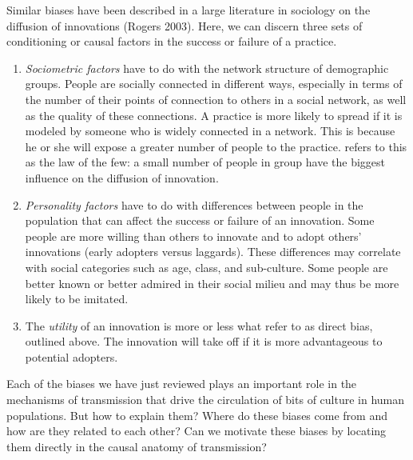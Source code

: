 Similar biases have been described in a large literature in sociology on 
the diffusion of innovations (Rogers 2003). Here, we can discern three 
sets of conditioning or causal factors in the success or failure of a 
practice. 

\begin{enumerate}
\item \textit{Sociometric factors} have to do with the network structure of 
demographic groups. People are socially 
connected in different ways, especially in terms of the number of their points of 
connection to others in a social network, as well as the quality of these connections. A practice is more likely to spread if 
it is modeled by someone who is widely connected in a network. This is because he or she will expose a greater number of people to the 
practice. \citet{gladwell_tipping_2000} refers to this as the law of the few: a small number of people in group have the biggest influence on the diffusion of innovation. 



\item \textit{Personality factors} have to do with differences between 
people in the population that can affect the success 
or failure of an innovation. Some people are more willing than others to 
innovate and to adopt others' innovations (early adopters versus 
laggards). These differences may correlate with social categories 
such as age, class, and sub-culture. Some people are better known or 
better admired in their social milieu and may thus be more likely to be 
imitated. 



\item The \textit{utility} of an innovation is more or 
less what \citet{boyd_culture_1985} refer to as direct bias,  outlined 
above. The innovation will take off if it is more advantageous to 
potential adopters. 
\end{enumerate}



Each of the biases we have just reviewed plays an important 
role in the mechanisms of transmission that drive the circulation of 
bits of culture in human populations. But how to explain them? Where do 
these biases come from and how are they related to each other? Can we motivate these biases by 
locating them directly in the causal anatomy of transmission?  


